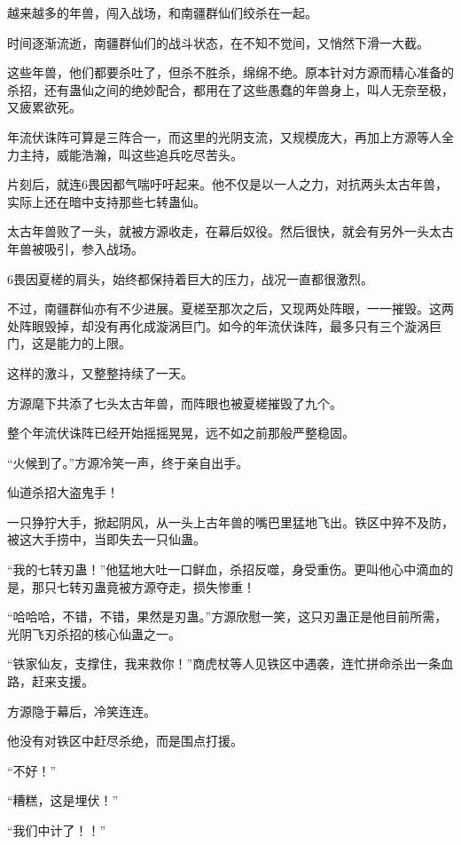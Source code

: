 
\begin{this_body}

越来越多的年兽，闯入战场，和南疆群仙们绞杀在一起。

时间逐渐流逝，南疆群仙们的战斗状态，在不知不觉间，又悄然下滑一大截。

这些年兽，他们都要杀吐了，但杀不胜杀，绵绵不绝。原本针对方源而精心准备的杀招，还有蛊仙之间的绝妙配合，都用在了这些愚蠢的年兽身上，叫人无奈至极，又疲累欲死。

年流伏诛阵可算是三阵合一，而这里的光阴支流，又规模庞大，再加上方源等人全力主持，威能浩瀚，叫这些追兵吃尽苦头。

片刻后，就连6畏因都气喘吁吁起来。他不仅是以一人之力，对抗两头太古年兽，实际上还在暗中支持那些七转蛊仙。

太古年兽败了一头，就被方源收走，在幕后奴役。然后很快，就会有另外一头太古年兽被吸引，参入战场。

6畏因夏槎的肩头，始终都保持着巨大的压力，战况一直都很激烈。

不过，南疆群仙亦有不少进展。夏槎至那次之后，又现两处阵眼，一一摧毁。这两处阵眼毁掉，却没有再化成漩涡巨门。如今的年流伏诛阵，最多只有三个漩涡巨门，这是能力的上限。

这样的激斗，又整整持续了一天。

方源麾下共添了七头太古年兽，而阵眼也被夏槎摧毁了九个。

整个年流伏诛阵已经开始摇摇晃晃，远不如之前那般严整稳固。

“火候到了。”方源冷笑一声，终于亲自出手。

仙道杀招大盗鬼手！

一只狰狞大手，掀起阴风，从一头上古年兽的嘴巴里猛地飞出。铁区中猝不及防，被这大手捞中，当即失去一只仙蛊。

“我的七转刃蛊！”他猛地大吐一口鲜血，杀招反噬，身受重伤。更叫他心中滴血的是，那只七转刃蛊竟被方源夺走，损失惨重！

“哈哈哈，不错，不错，果然是刃蛊。”方源欣慰一笑，这只刃蛊正是他目前所需，光阴飞刃杀招的核心仙蛊之一。

“铁家仙友，支撑住，我来救你！”商虎杖等人见铁区中遇袭，连忙拼命杀出一条血路，赶来支援。

方源隐于幕后，冷笑连连。

他没有对铁区中赶尽杀绝，而是围点打援。

“不好！”

“糟糕，这是埋伏！”

“我们中计了！！”


\end{this_body}
